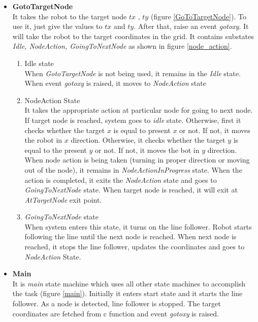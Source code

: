 \documentclass[a4paper,12pt,oneside]{book}
\begin{document}
\begin{itemize}
\item \textbf{GotoTargetNode}\\
It takes the robot to the target node $tx$ , $ty$ (figure \ref{GoToTargetNode}). To use it, just give the values to $tx$ and $ty$. After that, raise an event \textit{gotoxy}. It will take the robot to the target coordinates in the grid. It contains substates 
	 \textit{Idle, NodeAction, GoingToNextNode} as shown in figure \ref{node_action}. 
\begin{enumerate}
\item  Idle state\\
When \textit{GotoTargetNode} is not being used, it remains in the \textit{Idle} state. When event \textit{gotoxy} is raised, it moves to \textit{NodeAction} state
\item NodeAction State\\
It takes the appropriate action at particular node for going to next node. If target node is reached, system goes to \textit{idle} state. Otherwise, first it checks whether the target $x$ is equal to present $x$ or not. If not, it moves the robot in $x$ direction. Otherwise, it checks whether the target $y$ is equal to the present $y$ or not. If not, it moves the bot in $y$ direction. When node action is being taken (turning in proper direction or moving out of the node), it remains in \textit{NodeActionInProgress} state. When the action is completed, it exits the \textit{NodeAction} state and goes to \textit{GoingToNextNode} state. When target node is reached, it will exit at \textit{AtTargetNode} exit point. 
\item \textit{GoingToNextNode} state\\
When system enters this state, it turns on the line follower. Robot starts following the line until the next node is reached. When next node is reached, it stops the line follower, updates the coordinates and goes to \textit{NodeAction} State.
\end{enumerate}
\item \textbf{Main}\\ 
It is \textit{main} state machine which uses all other state machines to accomplish the task (figure \ref{main}). Initially it enters start state and it starts the line follower. As a node is detected, line follower is stopped. The target coordinates are fetched from c function and event \textit{gotoxy} is raised.
	\begin{figure}[]
	\centering

\end{figure}
\end{itemize}
\end{document}
